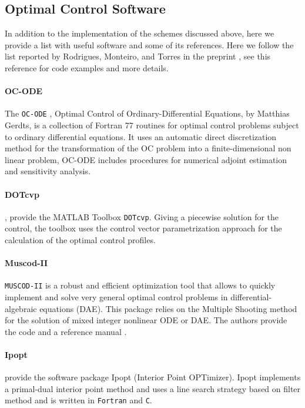 \subsection{Optimal Control Software}
  In addition to the implementation of the schemes discussed above, here we
  provide a list with useful software and some of its references. Here we follow
  the list reported by Rodrigues, Monteiro, and Torres in the preprint
  \cite{Rodrigues2014a}, see this reference for code examples and more details.
\medskip
\paragraph{OC-ODE}
  The \verb|OC-ODE| \cite{Gerdts2009}, Optimal Control of Ordinary-Differential 
Equations, by Matthias Gerdts, is a collection of Fortran 77 routines for 
optimal control problems subject to ordinary differential equations. It uses an 
automatic direct discretization method for the transformation of the OC problem 
into a finite-dimensional non linear problem, OC-ODE includes procedures for 
numerical adjoint estimation and sensitivity analysis. 
\medskip
\paragraph{DOTcvp}
  \citet{Hirmajer2009}, provide the MATLAB Toolbox \verb|DOTcvp|. Giving a 
piecewise solution for the control, the toolbox uses the control vector 
parametrization approach for the calculation of the  optimal control profiles. 
\medskip
\paragraph{Muscod-II}
  
  \verb|MUSCOD-II| is a robust and efficient optimization tool that allows to
quickly implement and solve very general optimal control problems in 
differential-algebraic equations (DAE). This package relies on the Multiple 
Shooting method for the solution of mixed integer nonlinear ODE or DAE. The 
authors%
provide the code and a reference manual 
\cite{Diehl2001}.
\medskip
\paragraph{Ipopt}
  \citet*{Wachter2006} provide the software package Ipopt (Interior Point 
  OPTimizer). Ipopt implements a primal-dual interior point method and uses a 
  line search strategy based on filter method and is written in \verb|Fortran| 
  and \verb|C|.
\medskip  
